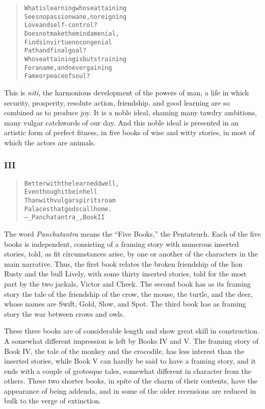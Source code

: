 \documentclass[article, twoside, 14pt]{memoir}
\renewenvironment{verbatim}{%
\begin{quote}%
\vskip -10pt%
\begin{alltt}\normalfont\large}{\end{alltt}%
\end{quote}%
\vskip -10pt
} %
\begin{document}
\begin{verbatim}
What is learning whose attaining
Sees no passion wane, no reigning
    Love and self-control?
Does not make the mind a menial,
Finds in virtue no congenial
    Path and final goal?
Whose attaining is but straining
For a name, and never gaining
    Fame or peace of soul?
\end{verbatim}
This is \emph{niti}, the harmonious development of the powers of
man, a life in which security, prosperity, resolute action,
friendship, and good learning are so combined as to produce joy. It
is a noble ideal, shaming many tawdry ambitions, many vulgar
catchwords of our day. And this noble ideal is presented in an
artistic form of perfect fitness, in five books of wise and witty
stories, in most of which the actors are animals.

\subsubsection{III}

\begin{verbatim}
Better with the learned dwell,
Even though it be in hell
Than with vulgar spirits roam
Palaces that gods call home.
        --_Panchatantra_, Book II
\end{verbatim}
The word \emph{Panchatantra} means the ``Five Books,'' the
Pentateuch. Each of the five books is independent, consisting of a
framing story with numerous inserted stories, told, as fit
circumstances arise, by one or another of the characters in the
main narrative. Thus, the first book relates the broken friendship
of the lion Rusty and the bull Lively, with some thirty inserted
stories, told for the most part by the two jackals, Victor and
Cheek. The second book has as its framing story the tale of the
friendship of the crow, the mouse, the turtle, and the deer, whose
names are Swift, Gold, Slow, and Spot. The third book has as
framing story the war between crows and owls.

These three books are of considerable length and show great skill
in construction. A somewhat different impression is left by Books
IV and V. The framing story of Book IV, the tale of the monkey and
the crocodile, has less interest than the inserted stories, while
Book V can hardly be said to have a framing story, and it ends with
a couple of grotesque tales, somewhat different in character from
the others. These two shorter books, in spite of the charm of their
contents, have the appearance of being addenda, and in some of the
older recensions are reduced in bulk to the verge of extinction.
\end{document}
